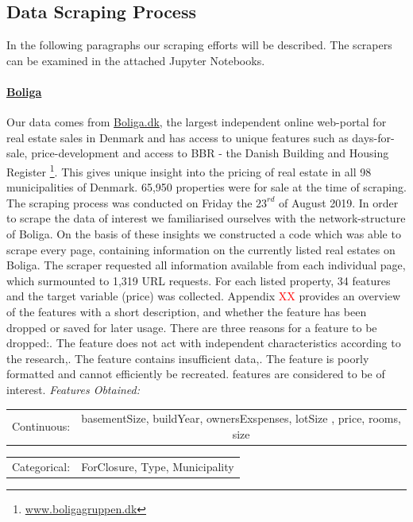 \documentclass[12pt,a4paper]{article}
\begin{document}
\subsection{Data Scraping Process}
In the following paragraphs our scraping efforts will be described. The scrapers can be examined in the attached Jupyter Notebooks. 
\paragraph{\href{https://www.boliga.dk}{Boliga}\newline}
Our data comes from \href{https://www.boliga.dk}{Boliga.dk}, the largest independent online web-portal for real estate sales in Denmark and has access to unique features such as days-for-sale, price-development and access to BBR - the Danish Building and Housing Register \footnote{\href{https://www.boligagruppen.dk}{www.boligagruppen.dk}}. This gives unique insight into the pricing of real estate in all 98 municipalities of Denmark. 65,950 properties were for sale at the time of scraping.\newline
The scraping process was conducted on Friday the $23^{rd}$ of August 2019. In order to scrape the data of interest we familiarised ourselves with the network-structure of Boliga. On the basis of these insights we constructed a code which was able to scrape every page, containing information on the currently listed real estates on Boliga. The scraper requested all information available from each individual page, which surmounted to 1,319 URL requests. \newline
For each listed property, 34 features and the target variable (price) was collected. Appendix \textcolor{red}{XX} provides an overview of the features with a short description, and whether the feature has been dropped or saved for later usage. There are three reasons for a feature to be dropped:. The feature does not act with independent characteristics according to the research,. The feature contains insufficient data,. The feature is poorly formatted and cannot efficiently be recreated.  features are considered to be of interest.
\vspace*{10px} \newline
\textit{Features Obtained:} \newline
\begin{tabular}{c c}
Continuous: & basementSize, buildYear, ownersExspenses, lotSize	, price, rooms, size  \\	
\end{tabular}\newline 
\begin{tabular}{c c}
Categorical: & ForClosure, Type, Municipality	 \\	
\end{tabular}
\end{document}
